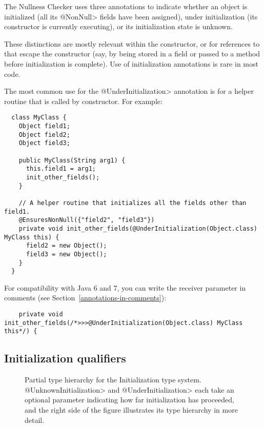 The Nullness Checker uses three annotations to indicate whether an object
is initialized (all its \<@NonNull> fields have been assigned), under
initialization (its constructor is currently executing), or its
initialization state is unknown.

These distinctions are mostly relevant within the constructor, or for
references to  that escape the constructor (say, by being stored
in a field or passed to a method before initialization is complete).
Use of initialization annotations is rare in most code.

The most common use for the \<@UnderInitialization> annotation is for a
helper routine that is called by constructor.  For example:

\begin{Verbatim}
  class MyClass {
    Object field1;
    Object field2;
    Object field3;

    public MyClass(String arg1) {
      this.field1 = arg1;
      init_other_fields();
    }

    // A helper routine that initializes all the fields other than field1.
    @EnsuresNonNull({"field2", "field3"})
    private void init_other_fields(@UnderInitialization(Object.class) MyClass this) {
      field2 = new Object();
      field3 = new Object();
    }
  }
\end{Verbatim}

For compatibility with Java 6 and 7, you can write the receiver
parameter in comments (see Section~\ref{annotations-in-comments}):
\begin{Verbatim}
    private void init_other_fields(/*>>>@UnderInitialization(Object.class) MyClass this*/) {
\end{Verbatim}


\subsection{Initialization qualifiers\label{initialization-qualifiers}}

\begin{figure}
\caption{Partial type hierarchy for the Initialization type system.
  \<@UnknownInitialization> and \<@UnderInitialization> each take an
  optional parameter indicating how far initialization has proceeded, and
  the right side of the figure illustrates its type hierarchy in more detail.}
\label{fig-initialization-hierarchy}
\end{figure}

